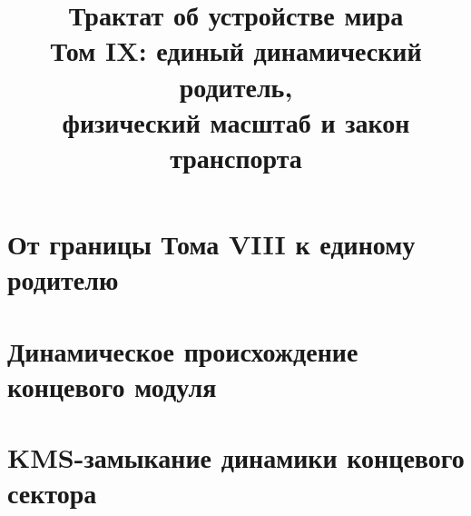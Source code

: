 \documentclass[12pt,a4paper]{report}
\title{Трактат об устройстве мира\\
Том IX: единый динамический родитель,\\
физический масштаб и закон транспорта}
\author{}
\date{}
\theoremstyle{remark}
\begin{document}
\hypersetup{pageanchor=false}
\maketitle
\clearpage
\hypersetup{pageanchor=true}
\setcounter{page}{1}
\tableofcontents
\clearpage
{}

\part{От границы Тома VIII к единому родителю}







\part{Динамическое происхождение концевого модуля}








\part{KMS-замыкание динамики концевого сектора}
\end{document}

